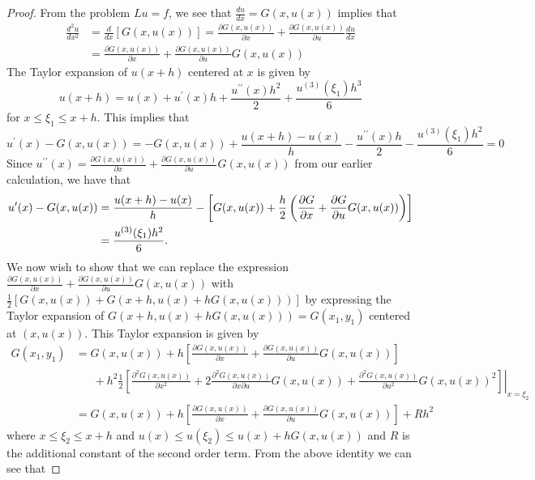 \documentclass[12pt]{article}
\theoremstyle{definition}
\begin{document}
\begin{proof}
  From the problem $Lu = f$, we see that $\frac{du}{dx} = G(x, u(x))$ implies that
  \begin{align*}
    \frac{d^2 u}{dx^2} &= \frac{d}{dx}\left[G(x, u(x))\right] = \frac{\partial G(x, u(x))}{\partial x} + \frac{\partial G(x, u(x))}{\partial u} \frac{du}{dx} \\
    &= \frac{\partial G(x, u(x))}{\partial x} + \frac{\partial G(x, u(x))}{\partial u} G(x, u(x))
  \end{align*}
  The Taylor expansion of $u(x+h)$ centered at $x$ is given by
  \[
    u(x + h) = u(x) + u^{\prime}(x) h + \frac{u^{\prime \prime}(x) h^2}{2} + \frac{u^{(3)}(\xi_1) h^3}{6}
  \]
  for $x \leq \xi_1 \leq x+h$. This implies that
  \[
    u^{\prime}(x) - G(x, u(x)) = -G(x, u(x)) + \frac{u(x+h) - u(x)}{h} - \frac{u^{\prime \prime}(x) h}{2} - \frac{u^{(3)}(\xi_1) h^2}{6} = 0
  \]
  Since $u^{\prime \prime}(x) = \frac{\partial G(x, u(x))}{\partial x} + \frac{\partial G(x, u(x))}{\partial u} G(x, u(x))$ from our earlier calculation, we have that
  \begin{align}\label{first_taylor}
    u^{\prime}(x) - G(x, u(x)) &= \frac{u(x+h) - u(x)}{h} - \left[G(x, u(x)) + \frac{h}{2}\left(\frac{\partial G}{\partial x} + \frac{\partial G}{\partial u} G(x, u(x))\right)\right] \\
    &= \frac{u^{(3)}(\xi_1) h^2}{6}.\notag
  \end{align}
  We now wish to show that we can replace the expression $\frac{\partial G(x, u(x))}{\partial x} + \frac{\partial G(x, u(x))}{\partial u} G(x, u(x))$ with
  $\frac{1}{2}[G(x, u(x)) + G(x + h, u(x) + h G(x, u(x)))]$ by expressing the Taylor expansion of $G(x + h, u(x) + h G(x, u(x))) = G(x_1, y_1)$
  centered at $(x, u(x))$. This Taylor expansion is given by
  \begin{align*}
    G(x_1, y_1) &= G(x, u(x)) + h\left[\frac{\partial G(x, u(x))}{\partial x} + \frac{\partial G(x, u(x))}{\partial u} G(x, u(x))\right]\\
    &\phantom{=}\ + \left. h^2\frac{1}{2}\left[\frac{\partial^2 G(x, u(x))}{\partial x^2} + 2 \frac{\partial^2 G(x, u(x))}{\partial x \partial u}G(x, u(x)) + \frac{\partial ^2G(x, u(x))}{\partial u^2}G(x, u(x))^2\right] \right|_{x=\xi_2}\\
    &= G(x, u(x)) + h\left[\frac{\partial G(x, u(x))}{\partial x} + \frac{\partial G(x, u(x))}{\partial u} G(x, u(x))\right] + R h^2
  \end{align*}
  where $x \leq \xi_2 \leq x + h$ and $u(x) \leq u(\xi_2) \leq u(x) + hG(x, u(x))$
  and $R$ is the additional constant of the second order term. From the above identity we can see that

\end{proof}
\end{document}
